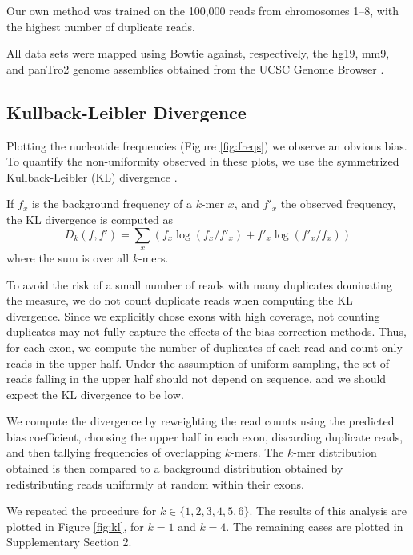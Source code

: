 \documentclass{bioinfo}
\begin{document}
Our own method was trained on the 100,000 reads from chromosomes 1--8, with the
highest number of duplicate reads.

All data sets were mapped using Bowtie \citep{Langmead2009} against,
respectively, the hg19, mm9, and panTro2 genome assemblies obtained from the
UCSC Genome Browser \citep{Karolchik2008}.



\subsection{Kullback-Leibler Divergence}



Plotting the nucleotide frequencies (Figure  \ref{fig:freqs}) we observe an
obvious bias. To quantify the non-uniformity observed in these plots, we use the
symmetrized Kullback-Leibler (KL) divergence \citep{Kullback1951}.

If $f_x$ is the background frequency of a $k$-mer $x$, and $f'_x$ the observed
frequency, the KL divergence is computed as
$$D_k( f, f' ) = \sum_{x} \left( f_x \log( f_x / f'_x ) + f'_x \log( f'_x / f_x) \right)$$
where the sum is over all $k$-mers.


To avoid the risk of a small number of reads with many duplicates dominating the
measure, we do not count duplicate reads when computing the KL divergence. Since we
explicitly chose exons with high coverage, not counting duplicates may not
fully capture the effects of the bias correction methods. Thus, for each exon,
we compute the number of duplicates of each read and count only reads in the
upper half. Under the assumption of uniform sampling, the set of reads falling
in the upper half should not depend on sequence, and we should expect the KL
divergence to be low.

We compute the divergence by reweighting the read counts using the predicted
bias coefficient, choosing the upper half in each exon, discarding duplicate
reads, and then tallying frequencies of overlapping $k$-mers. The $k$-mer
distribution obtained is then compared to a background distribution obtained by
redistributing reads uniformly at random within their exons.

We repeated the procedure for $k \in \{1, 2, 3, 4, 5, 6\}$. The results of this
analysis are plotted in Figure \ref{fig:kl}, for $k = 1$ and $k = 4$. The
remaining cases are plotted in Supplementary Section 2.
\end{document}
